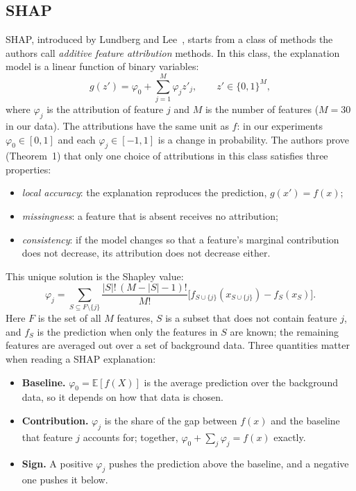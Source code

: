 \documentclass[11pt,a4paper]{article}
\begin{document}
\subsection{SHAP}
\label{sec:shap}
SHAP, introduced by Lundberg and Lee~\cite{lundberg}, starts from a class of
methods the authors call \emph{additive feature attribution} methods. In this
class, the explanation model is a linear function of binary variables:
\begin{equation}
g(z') = \varphi_0 + \sum_{j=1}^{M} \varphi_j z'_j, \qquad z' \in \{0, 1\}^M,
\end{equation}
where $\varphi_j$ is the attribution of feature $j$ and $M$ is the number of
features ($M = 30$ in our data). The attributions have the same unit as $f$:
in our experiments $\varphi_0 \in [0, 1]$ and each $\varphi_j \in [-1, 1]$ is
a change in probability. The authors prove (Theorem~1) that only one choice of
attributions in this class satisfies three properties:
\begin{itemize}
  \item \emph{local accuracy}: the explanation reproduces the prediction,
        $g(x') = f(x)$;
  \item \emph{missingness}: a feature that is absent receives no attribution;
  \item \emph{consistency}: if the model changes so that a feature's marginal
        contribution does not decrease, its attribution does not decrease
        either.
\end{itemize}
This unique solution is the Shapley value:
\begin{equation}
\varphi_j = \sum_{S \subseteq F \setminus \{j\}} \frac{|S|! \, (M - |S| - 1)!}{M!} \Big[ f_{S \cup \{j\}}(x_{S \cup \{j\}}) - f_S(x_S) \Big].
\end{equation}
Here $F$ is the set of all $M$ features, $S$ is a subset that does not contain
feature $j$, and $f_S$ is the prediction when only the features in $S$ are
known; the remaining features are averaged out over a set of background data.
Three quantities matter when reading a SHAP explanation:
\begin{itemize}
  \item \textbf{Baseline.} $\varphi_0 = \mathbb{E}[f(X)]$ is the average
        prediction over the background data, so it depends on how that data is
        chosen.
  \item \textbf{Contribution.} $\varphi_j$ is the share of the gap between
        $f(x)$ and the baseline that feature $j$ accounts for; together,
        $\varphi_0 + \sum_j \varphi_j = f(x)$ exactly.
  \item \textbf{Sign.} A positive $\varphi_j$ pushes the prediction above the
        baseline, and a negative one pushes it below.
\end{itemize}
\end{document}

